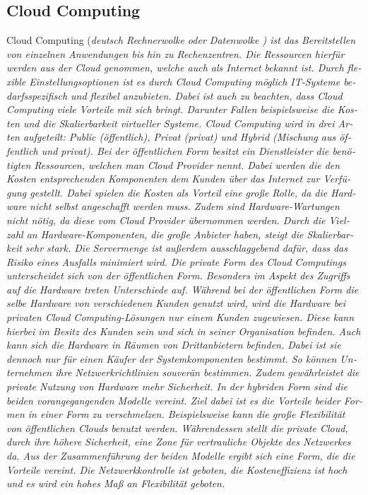 \begin{otherlanguage}{ngerman}
\subsection{Cloud Computing}
Cloud Computing (\it deutsch Rechnerwolke oder Datenwolke \rm) ist das Bereitstellen von einzelnen Anwendungen bis hin zu Rechenzentren. Die Ressourcen hierfür werden aus der \it Cloud \rm genommen, welche auch als \it Internet \rm bekannt ist. Durch flexible Einstellungsoptionen ist es durch Cloud Computing möglich IT-Systeme bedarfsspezifisch und flexibel anzubieten. Dabei ist auch zu beachten, dass Cloud Computing viele Vorteile mit sich bringt. Darunter Fallen beispielsweise die Kosten und die Skalierbarkeit virtueller Systeme. 
\newline 
Cloud Computing wird in drei Arten aufgeteilt: Public (öffentlich), Privat (privat) und Hybrid (Mischung aus öffentlich und privat). Bei der öffentlichen Form besitzt ein Dienstleister die benötigten Ressourcen, welchen man \it Cloud Provider \rm nennt. Dabei werden die den Kosten entsprechenden Komponenten dem Kunden über das Internet zur Verfügung gestellt. Dabei spielen die Kosten als Vorteil eine große Rolle, da die Hardware nicht selbst angeschafft werden muss. Zudem sind Hardware-Wartungen nicht nötig, da diese vom \it Cloud Provider \rm übernommen werden. Durch die Vielzahl an Hardware-Komponenten, die große Anbieter haben, steigt die Skalierbarkeit sehr stark. Die Servermenge ist außerdem ausschlaggebend dafür, dass das Risiko eines Ausfalls minimiert wird. 
\newline
Die private Form des Cloud Computings unterscheidet sich von der öffentlichen Form. Besonders im Aspekt des Zugriffs auf die Hardware treten Unterschiede auf. Während bei der öffentlichen Form die selbe Hardware von verschiedenen Kunden genutzt wird, wird die Hardware bei privaten Cloud Computing-Lösungen nur einem Kunden zugewiesen. Diese kann hierbei im Besitz des Kunden sein und sich in seiner Organisation befinden. Auch kann sich die Hardware in Räumen von Drittanbietern befinden. Dabei ist sie dennoch nur für einen Käufer der Systemkomponenten bestimmt. So können Unternehmen ihre Netzwerkrichtlinien souverän bestimmen. Zudem gewährleistet die private Nutzung von Hardware mehr Sicherheit. 
\newline
In der hybriden Form sind die beiden vorangegangenden Modelle vereint. Ziel dabei ist es die Vorteile beider Formen in einer Form zu verschmelzen. Beispielsweise kann die große Flexibilität von öffentlichen Clouds benutzt werden. Währendessen stellt die private Cloud, durch ihre höhere Sicherheit, eine Zone für vertrauliche Objekte des Netzwerkes da. Aus der Zusammenführung der beiden Modelle ergibt sich eine Form, die die Vorteile vereint. Die Netzwerkkontrolle ist geboten, die Kosteneffizienz ist hoch und es wird ein hohes Maß an Flexibilität geboten. 


\end{otherlanguage}

